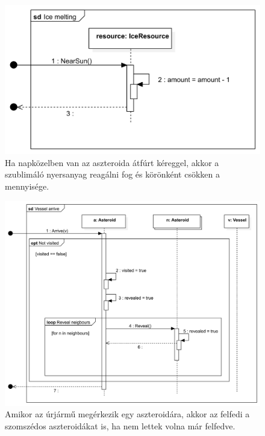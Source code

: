 \begin{figure}[H] 
\centering 
\includegraphics[width=1\textwidth]{docs/3_Project/svg/Design Model!Sun Distance!Ice melting!Ice melting_8.png} 
\caption{Ha napközelben van az aszteroida átfúrt kéreggel, akkor a szublimáló nyersanyag reagálni fog és körönként csökken a mennyisége.} 
\end{figure} 

\begin{figure}[H] 
\centering 
\includegraphics[width=1\textwidth]{docs/3_Project/svg/Design Model!Vessel Actions!Vessel arrive!Vessel arrive_9.png} 
\caption{Amikor az úrjármű megérkezik egy aszteroidára, akkor az felfedi a szomszédos aszteroidákat is, ha nem lettek volna már felfedve.} 
\end{figure} 


